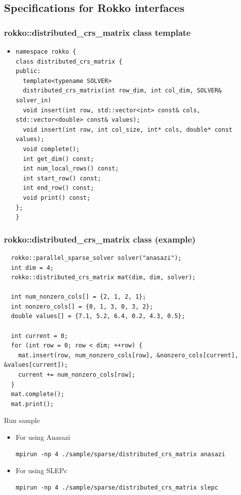 \subsection{Specifications for Rokko interfaces}

\begin{frame}[c,fragile]
  \frametitle{rokko::distributed_crs_matrix class template}
  \begin{itemize}
  \item {}
\begin{lstlisting}
namespace rokko {
class distributed_crs_matrix {
public:
  template<typename SOLVER>
  distributed_crs_matrix(int row_dim, int col_dim, SOLVER& solver_in)
  void insert(int row, std::vector<int> const& cols, std::vector<double> const& values);
  void insert(int row, int col_size, int* cols, double* const values);
  void complete();
  int get_dim() const;
  int num_local_rows() const;
  int start_row() const;
  int end_row() const;
  void print() const;
};
}
\end{lstlisting}
  \end{itemize}
\end{frame}


\begin{frame}[c,fragile]
  \frametitle{rokko::distributed_crs_matrix class (example)}
\begin{lstlisting}
  rokko::parallel_sparse_solver solver("anasazi");
  int dim = 4;
  rokko::distributed_crs_matrix mat(dim, dim, solver);

  int num_nonzero_cols[] = {2, 1, 2, 1};
  int nonzero_cols[] = {0, 1, 3, 0, 3, 2};
  double values[] = {7.1, 5.2, 6.4, 0.2, 4.3, 0.5};

  int current = 0;
  for (int row = 0; row < dim; ++row) {
    mat.insert(row, num_nonzero_cols[row], &nonzero_cols[current], &values[current]);
    current += num_nonzero_cols[row];
  }
  mat.complete();
  mat.print();
\end{lstlisting}
\noindent
Run sample
  \begin{itemize}
  \item For using Anasazi
\begin{lstlisting}[style=shstyle]
mpirun -np 4 ./sample/sparse/distributed_crs_matrix anasazi
\end{lstlisting}
  \item For using SLEPc
\begin{lstlisting}[style=shstyle]
mpirun -np 4 ./sample/sparse/distributed_crs_matrix slepc
\end{lstlisting}
  \end{itemize}
\end{frame}


